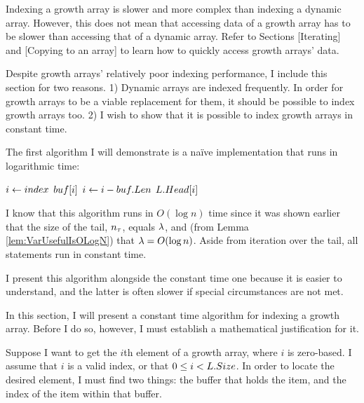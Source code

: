 \HdrGrowthArrayImpl

Indexing a growth array is slower and more complex than indexing a dynamic array. However, this does not mean that accessing data of a growth array has to be slower than accessing that of a dynamic array. Refer to Sections [Iterating] and [Copying to an array] to learn how to quickly access growth arrays' data.

Despite growth arrays' relatively poor indexing performance, I include this section for two reasons. 1) Dynamic arrays are indexed frequently. In order for growth arrays to be a viable replacement for them, it should be possible to index growth arrays too. 2) I wish to show that it is possible to index growth arrays in constant time.

\HdrLogarithmicImpl

The first algorithm I will demonstrate is a na\"{i}ve implementation that runs in logarithmic time:

\begin{algorithm}
	\begin{algorithmic}
		\Function{$\FuncGetItem$}{$\VarList,\ \ParamIndex$}
			\State $i \gets index$
					\State \Return $buf[i]$
				\EndIf
				\State $i \gets i - buf.Len$
			\EndFor
			\State \Return $L.Head[i]$
		\EndFunction
	\end{algorithmic}
\end{algorithm}

I know that this algorithm runs in $O(\log n)$ time since it was shown earlier that the size of the tail, $n_\tau$, equals $\lambda$, and (from Lemma \ref{lem:VarUsefulIsOLogN}) that $\lambda = O(\log n)$. Aside from iteration over the tail, all statements run in constant time.

I present this algorithm alongside the constant time one because it is easier to understand, and the latter is often slower if special circumstances are not met.

\HdrConstantImpl

In this section, I will present a constant time algorithm for indexing a growth array. Before I do so, however, I must establish a mathematical justification for it.

Suppose I want to get the $i$th element of a growth array, where $i$ is zero-based. I assume that $i$ is a valid index, or that $0 \leq i < L.Size$. In order to locate the desired element, I must find two things: the buffer that holds the item, and the index of the item within that buffer.


